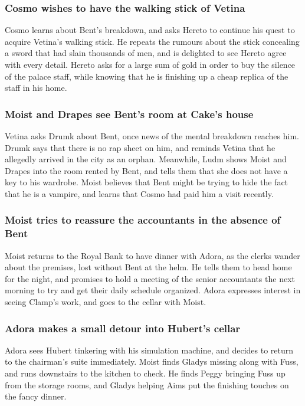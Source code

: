 \subsubsection{\Gls{Cosmo} wishes to have the walking stick of \Gls{Vetina}}
\Gls{Cosmo} learns about \Gls{Bent}'s breakdown, and asks \Gls{Hereto} to continue his quest to
acquire \Gls{Vetina}'s walking stick. He repeats the rumours about the stick concealing a sword that
had slain thousands of men, and is delighted to see \Gls{Hereto} agree with every detail.
\Gls{Hereto} asks for a large sum of gold in order to buy the silence of the palace staff, while
knowing that he is finishing up a cheap replica of the staff in his home.

\subsubsection{\Gls{Moist} and \Gls{Drapes} see \Gls{Bent}'s room at \Gls{Cake}'s house}
\Gls{Vetina} asks \Gls{Drumk} about \Gls{Bent}, once news of the mental breakdown reaches him.
\Gls{Drumk} says that there is no rap sheet on him, and reminds \Gls{Vetina} that he allegedly
arrived in the city as an orphan. Meanwhile, \Gls{Ludm} shows \Gls{Moist} and \Gls{Drapes} into the
room rented by \Gls{Bent}, and tells them that she does not have a key to his wardrobe. \Gls{Moist}
believes that \Gls{Bent} might be trying to hide the fact that he is a vampire, and learns that
\Gls{Cosmo} had paid him a visit recently.

\subsubsection{\Gls{Moist} tries to reassure the accountants in the absence of \Gls{Bent}}
\Gls{Moist} returns to the Royal Bank to have dinner with \Gls{Adora}, as the clerks wander about
the premises, lost without \Gls{Bent} at the helm. He tells them to head home for the night, and
promises to hold a meeting of the senior accountants the next morning to try and get their daily
schedule organized. \Gls{Adora} expresses interest in seeing \Gls{Clamp}'s work, and goes to the
cellar with \Gls{Moist}.

\subsubsection{\Gls{Adora} makes a small detour into \Gls{Hubert}'s cellar}
\Gls{Adora} sees \Gls{Hubert} tinkering with his simulation machine, and decides to return to the
chairman's suite immediately. \Gls{Moist} finds \Gls{Gladys} missing along with \Gls{Fuss}, and runs
downstairs to the kitchen to check. He finds \Gls{Peggy} bringing \Gls{Fuss} up from the storage
rooms, and \Gls{Gladys} helping \Gls{Aims} put the finishing touches on the fancy dinner.

